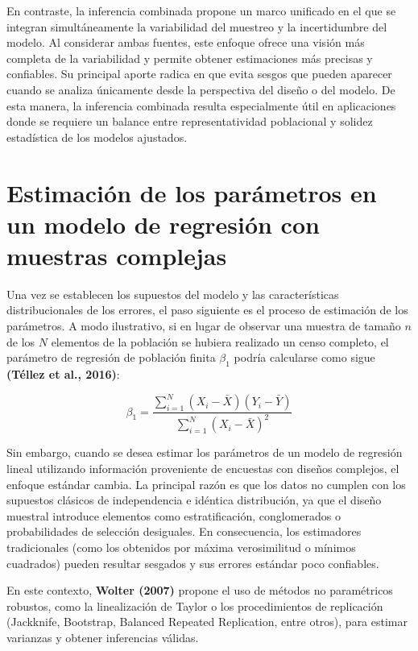 \documentclass[
  12pt,
]{book}
\begin{document}
En contraste, la inferencia combinada propone un marco unificado en el que se integran simultáneamente la variabilidad del muestreo y la incertidumbre del modelo. Al considerar ambas fuentes, este enfoque ofrece una visión más completa de la variabilidad y permite obtener estimaciones más precisas y confiables. Su principal aporte radica en que evita sesgos que pueden aparecer cuando se analiza únicamente desde la perspectiva del diseño o del modelo. De esta manera, la inferencia combinada resulta especialmente útil en aplicaciones donde se requiere un balance entre representatividad poblacional y solidez estadística de los modelos ajustados.

\section{Estimación de los parámetros en un modelo de regresión con muestras complejas}\label{estimaciuxf3n-de-los-paruxe1metros-en-un-modelo-de-regresiuxf3n-con-muestras-complejas}

Una vez se establecen los supuestos del modelo y las características distribucionales de los errores, el paso siguiente es el proceso de estimación de los parámetros. A modo ilustrativo, si en lugar de observar una muestra de tamaño \(n\) de los \(N\) elementos de la población se hubiera realizado un censo completo, el parámetro de regresión de población finita \(\beta_{1}\) podría calcularse como sigue \textbf{(Téllez et al., 2016)}:

\[
\beta_{1}  =  \frac{\sum_{i=1}^{N}\left(X_{i}-\bar{X}\right)\left(Y_{i}-\bar{Y}\right)}{\sum_{i=1}^{N}\left(X_{i}-\bar{X}\right)^{2}}
\]

Sin embargo, cuando se desea estimar los parámetros de un modelo de regresión lineal utilizando información proveniente de encuestas con diseños complejos, el enfoque estándar cambia. La principal razón es que los datos no cumplen con los supuestos clásicos de independencia e idéntica distribución, ya que el diseño muestral introduce elementos como estratificación, conglomerados o probabilidades de selección desiguales. En consecuencia, los estimadores tradicionales (como los obtenidos por máxima verosimilitud o mínimos cuadrados) pueden resultar sesgados y sus errores estándar poco confiables.

En este contexto, \textbf{Wolter (2007)} propone el uso de métodos no paramétricos robustos, como la linealización de Taylor o los procedimientos de replicación (Jackknife, Bootstrap, Balanced Repeated Replication, entre otros), para estimar varianzas y obtener inferencias válidas.
\end{document}
